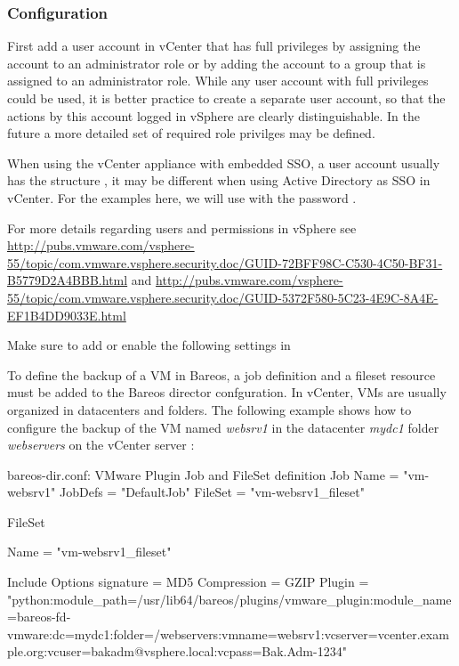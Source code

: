 \subsubsection{Configuration}

First add a user account in vCenter that has full privileges by assigning
the account to an administrator role or by adding the account to a group
that is assigned to an administrator role. While any user account
with full privileges could be used, it is better practice to create a separate
user account, so that the actions by this account logged in vSphere are clearly
distinguishable. In the future a more detailed set of required role privilges
may be defined.

When using the vCenter appliance with embedded SSO, a user account usually has the
structure , it may be different when using
Active Directory as SSO in vCenter. For the examples here, we will use
 with the password .

For more details regarding users and permissions in vSphere see
\url{http://pubs.vmware.com/vsphere-55/topic/com.vmware.vsphere.security.doc/GUID-72BFF98C-C530-4C50-BF31-B5779D2A4BBB.html} and
\url{http://pubs.vmware.com/vsphere-55/topic/com.vmware.vsphere.security.doc/GUID-5372F580-5C23-4E9C-8A4E-EF1B4DD9033E.html}

Make sure to add or enable the following settings in

To define the backup of a VM in Bareos, a job definition and a fileset
resource must be added to the Bareos director confguration.
In vCenter, VMs are usually organized in datacenters and folders.
The following example shows how to configure the backup of the VM
named \textit{websrv1} in the datacenter \textit{mydc1}
folder \textit{webservers} on the vCenter server :

\begin{bconfig}{bareos-dir.conf: VMware Plugin Job and FileSet definition}
Job {
  Name = "vm-websrv1"
  JobDefs = "DefaultJob"
  FileSet = "vm-websrv1_fileset"
}

FileSet {
  Name = "vm-websrv1_fileset"

  Include {
    Options {
         signature = MD5
         Compression = GZIP
    }
    Plugin = "python:module_path=/usr/lib64/bareos/plugins/vmware_plugin:module_name=bareos-fd-vmware:dc=mydc1:folder=/webservers:vmname=websrv1:vcserver=vcenter.example.org:vcuser=bakadm@vsphere.local:vcpass=Bak.Adm-1234"
  }
}
\end{bconfig}

